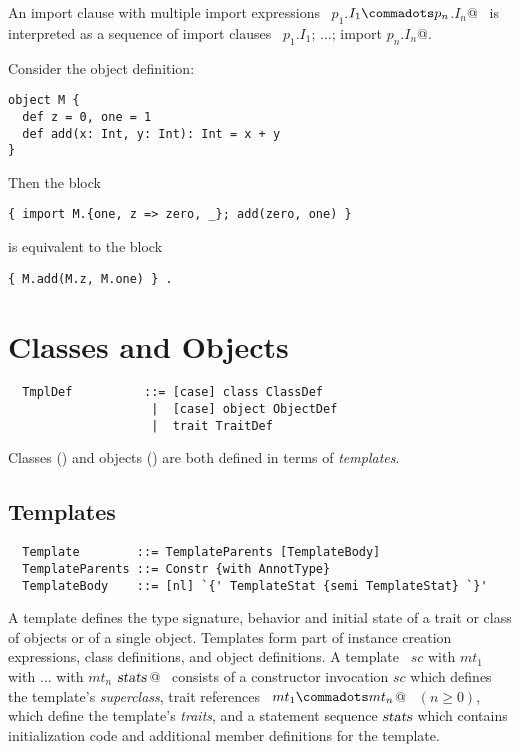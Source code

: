 An import clause with multiple import expressions
~\lstinline@import $p_1$.$I_1 \commadots p_n$.$I_n$@~ is interpreted as a
sequence of import clauses 
~\lstinline@import $p_1$.$I_1$; $\ldots$; import $p_n$.$I_n$@.

\example Consider the object definition:
\begin{lstlisting}
object M { 
  def z = 0, one = 1  
  def add(x: Int, y: Int): Int = x + y 
}
\end{lstlisting}
Then the block
\begin{lstlisting}
{ import M.{one, z => zero, _}; add(zero, one) }
\end{lstlisting}
is equivalent to the block 
\begin{lstlisting}
{ M.add(M.z, M.one) } .
\end{lstlisting}

\chapter{Classes and Objects}
\label{sec:globaldefs}

\syntax\begin{lstlisting}
  TmplDef          ::= [case] class ClassDef
                    |  [case] object ObjectDef
                    |  trait TraitDef
\end{lstlisting}

Classes () and objects
() are both defined in terms of {\em templates}.

\section{Templates}
\label{sec:templates}

\syntax\begin{lstlisting}
  Template        ::= TemplateParents [TemplateBody]
  TemplateParents ::= Constr {with AnnotType}
  TemplateBody    ::= [nl] `{' TemplateStat {semi TemplateStat} `}'
\end{lstlisting}

A template defines the type signature, behavior and initial state of a
trait or class of objects or of a single object. Templates form part of
instance creation expressions, class definitions, and object
definitions.  A template 
~\lstinline@$sc$ with $mt_1$ with $\ldots$ with $mt_n$ {$\mbox{\sl stats}\,$}@~ 
consists of a constructor invocation $sc$
which defines the template's {\em superclass}, trait references
~\lstinline@$mt_1 \commadots mt_n$@~ $(n \geq 0)$, which define the
template's {\em traits}, and a statement sequence $\mbox{\sl stats}$ which
contains initialization code and additional member definitions for the
template.

